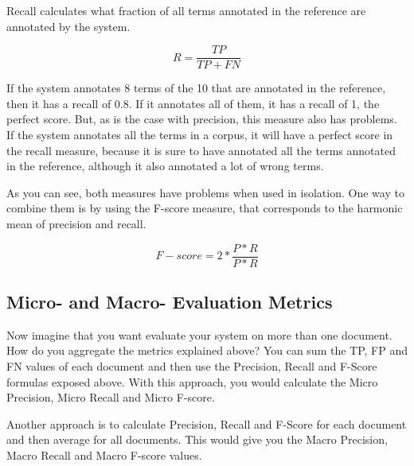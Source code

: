 Recall calculates what fraction of all terms annotated in the reference are annotated by the system.

\begin{equation}
R = \frac{TP}{TP+FN}
\end{equation}

If the system annotates 8 terms of the 10 that are annotated in the reference, then it has a recall of 0.8. If it annotates all of them, it has a recall of 1, the perfect score. But, as is the case with precision, this measure also has problems. If the system annotates all the terms in a corpus, it will have a perfect score in the recall measure, because it is sure to have annotated all the terms annotated in the reference, although it also annotated a lot of wrong terms. 

As you can see, both measures have problems when used in isolation. One way to combine them is by using the F-score measure, that corresponds to the harmonic mean of precision and recall. 

\begin{equation}
F−score = 2 * \frac{P*R}{P*R}
\end{equation}

\subsection{Micro- and Macro- Evaluation Metrics}

Now imagine that you want evaluate your system on more than one document. How do you aggregate the metrics explained above? You can sum the TP, FP and FN values of each document and then use the Precision, Recall and F-Score formulas exposed above. With this approach, you would calculate the Micro Precision, Micro Recall and Micro F-score.

Another approach is to calculate Precision, Recall and F-Score for each document and then average for all documents. This would give you the Macro Precision, Macro Recall and Macro F-score values. 


